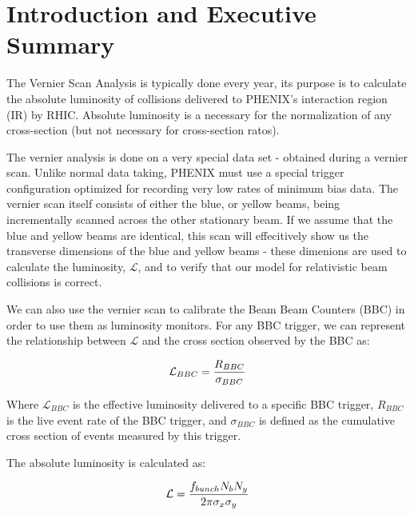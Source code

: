 \pagestyle{empty}


\clearpage

\pagestyle{fancy}

\chapter{Introduction and Executive Summary}
\label{ch:intro}
The Vernier Scan Analysis is typically done every year, its purpose is to calculate the
absolute luminosity of collisions delivered to PHENIX's interaction region (IR) by RHIC.
Absolute luminosity is a necessary for the normalization of any cross-section (but not
necessary for cross-section ratos).  

The vernier analysis is done on a very special data set - obtained during a vernier scan.
Unlike normal data taking, PHENIX must use a special trigger configuration optimized for
recording very low rates of minimum bias data. The vernier scan itself consists of either
the blue, or yellow beams, being incrementally scanned across the other stationary beam.
If we assume that the blue and yellow beams are identical, this scan will effecitively
show us the transverse dimensions of the blue and yellow beams - these dimenions are used
to calculate the luminosity, $\mathcal{L}$, and to verify that our model for relativistic
beam collisions is correct.

We can also use the vernier scan to calibrate the Beam Beam Counters (BBC) in order to use
them as luminosity monitors. For any BBC trigger, we can represent the relationship
between $\mathcal{L}$ and the cross section observed by the BBC as:

\begin{equation} 
\label{eq:lumi_xsec_simple} 
\mathcal{L}_{BBC} = {R_{BBC}\over\sigma_{BBC}} 
\end{equation}

Where $\mathcal{L}_{BBC}$ is the effective luminosity delivered to a specific BBC trigger,
$R_{BBC}$ is the live event rate of the BBC trigger, and $\sigma_{BBC}$ is defined as the
cumulative cross section of events measured by this trigger.

The absolute luminosity is calculated as:

\begin{equation} 
\label{eq:lumi_one_bunch} 
\mathcal{L} = {f_{bunch}N_{b} N_{y}\over{2\pi\sigma_{x}\sigma_{y}}} 
\end{equation}

